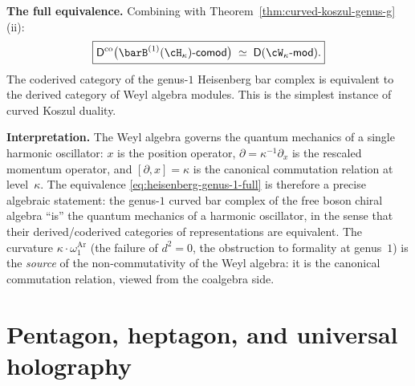 \begin{example}
\smallskip\noindent
\textbf{The full equivalence.}
Combining with
Theorem~\ref{thm:curved-koszul-genus-g}(ii):
\begin{equation}\label{eq:heisenberg-genus-1-full}
 \boxed{
 \Dco\bigl(\barB^{(1)}(\cH_\kappa)\text{-}\mathsf{comod}\bigr)
 \;\simeq\;
 \mathsf{D}(\cW_\kappa\text{-}\mathsf{mod}).
 }
\end{equation}
The coderived category of the genus-$1$ Heisenberg bar complex is
equivalent to the derived category of Weyl algebra modules. This
is the simplest instance of curved Koszul duality.

\smallskip\noindent
\textbf{Interpretation.}
The Weyl algebra governs the quantum mechanics of a single
harmonic oscillator: $x$ is the position operator,
$\partial = \kappa^{-1}\partial_x$ is the rescaled momentum
operator, and $[\partial, x] = \kappa$ is the canonical
commutation relation at level~$\kappa$. The equivalence
\eqref{eq:heisenberg-genus-1-full} is therefore a precise algebraic
statement: the genus-$1$ curved bar complex of the free boson
chiral algebra ``is'' the quantum mechanics of a harmonic
oscillator, in the sense that their derived/coderived categories
of representations are equivalent. The curvature
$\kappa \cdot \omega_1^{\mathrm{Ar}}$ (the failure of $d^2 = 0$, the obstruction
to formality at genus~$1$) is the \emph{source} of the
non-commutativity of the Weyl algebra: it is the canonical
commutation relation, viewed from the coalgebra side.
\end{example}

\section{Pentagon, heptagon, and universal holography}
\label{sec:factorization-sc-anchors}

